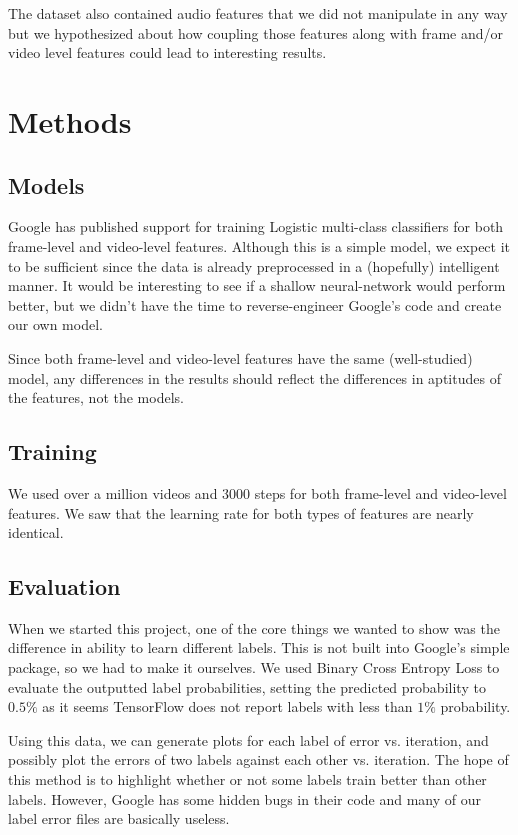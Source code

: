 \documentclass{article}
\newcommand{\ind}[0]{\indent}
\begin{document}
The dataset also contained audio features that we did not manipulate in any way but we hypothesized about how coupling those features along with frame and/or video level features could lead to interesting results.


\section{Methods} %

\subsection{Models}

\ind\ind Google has published support for training Logistic multi-class classifiers for both frame-level and video-level features. Although this is a simple model, we expect it to be sufficient since the data is already preprocessed in a (hopefully) intelligent manner. It would be interesting to see if a shallow neural-network would perform better, but we didn't have the time to reverse-engineer Google's code and create our own model.

Since both frame-level and video-level features have the same (well-studied) model, any differences in the results should reflect the differences in aptitudes of the features, not the models.

\subsection{Training}

\ind\ind We used over a million videos and 3000 steps for both frame-level and video-level features. We saw that the learning rate for both types of features are nearly identical.

\subsection{Evaluation}

\ind\ind When we started this project, one of the core things we wanted to show was the difference in ability to learn different labels. This is not built into Google’s simple package, so we had to make it ourselves. We used Binary Cross Entropy Loss to evaluate the outputted label probabilities, setting the predicted probability to $0.5\%$ as it seems TensorFlow does not report labels with less than $1\%$ probability.

Using this data, we can generate plots for each label of error vs. iteration, and possibly plot the errors of two labels against each other vs. iteration. The hope of this method is to highlight whether or not some labels train better than other labels. However, Google has some hidden bugs in their code and many of our label error files are basically useless.
\end{document}
